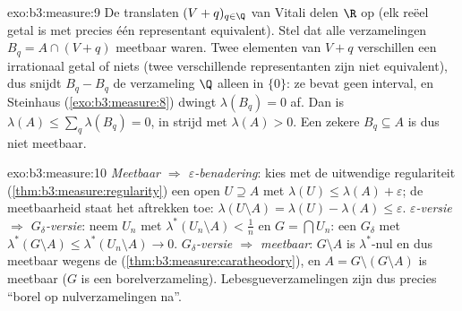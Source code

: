\begin{solution}{exo:b3:measure:9}
De translaten $(V + q)_{q\in\Q}$ van Vitali delen $\R$ op (elk
reëel getal is met precies één representant equivalent). Stel dat
alle verzamelingen $B_q = A \cap (V + q)$ meetbaar waren. Twee
elementen van $V + q$ verschillen een irrationaal getal of niets
(twee verschillende representanten zijn niet equivalent), dus
snijdt $B_q - B_q$ de verzameling $\Q$ alleen in $\{0\}$: ze bevat
geen interval, en Steinhaus (\cref{exo:b3:measure:8}) dwingt
$\lambda(B_q) = 0$ af. Dan is $\lambda(A) \leq
\sum_{q}\lambda(B_q) = 0$, in strijd met $\lambda(A) > 0$. Een
zekere $B_q \subseteq A$ is dus niet meetbaar.
\end{solution}

\begin{solution}{exo:b3:measure:10}
\emph{Meetbaar $\Rightarrow$ $\varepsilon$-benadering}: kies met
de uitwendige regulariteit (\cref{thm:b3:measure:regularity}) een
open $U \supseteq A$ met $\lambda(U) \leq \lambda(A) +
\varepsilon$; de meetbaarheid staat het aftrekken toe:
$\lambda(U\setminus A) = \lambda(U) - \lambda(A) \leq
\varepsilon$. \emph{$\varepsilon$-versie $\Rightarrow$
$G_\delta$-versie}: neem $U_n$ met $\lambda^*(U_n\setminus A) <
\frac1n$ en $G = \bigcap U_n$: een $G_\delta$ met
$\lambda^*(G\setminus A) \leq \lambda^*(U_n\setminus A) \to 0$.
\emph{$G_\delta$-versie $\Rightarrow$ meetbaar}: $G\setminus A$ is
$\lambda^*$-nul en dus meetbaar wegens de 
(\cref{thm:b3:measure:caratheodory}), en $A = G \setminus
(G\setminus A)$ is meetbaar ($G$ is een borelverzameling).
Lebesgueverzamelingen zijn dus precies ``borel op
nulverzamelingen na''.
\end{solution}

